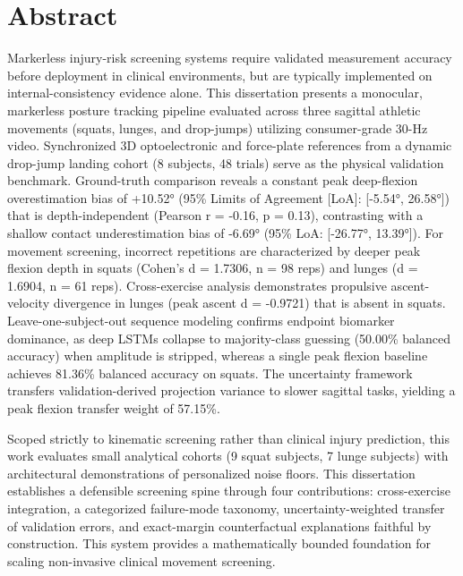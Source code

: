 \chapter*{Abstract}
\label{abstract}



Markerless injury-risk screening systems require validated measurement accuracy before deployment in clinical environments, but are typically implemented on internal-consistency evidence alone. This dissertation presents a monocular, markerless posture tracking pipeline evaluated across three sagittal athletic movements (squats, lunges, and drop-jumps) utilizing consumer-grade 30-Hz video. Synchronized 3D optoelectronic and force-plate references from a dynamic drop-jump landing cohort (8 subjects, 48 trials) serve as the physical validation benchmark. Ground-truth comparison reveals a constant peak deep-flexion overestimation bias of +10.52° (95\% Limits of Agreement [LoA]: [-5.54°, 26.58°]) that is depth-independent (Pearson r = -0.16, p = 0.13), contrasting with a shallow contact underestimation bias of -6.69° (95\% LoA: [-26.77°, 13.39°]). For movement screening, incorrect repetitions are characterized by deeper peak flexion depth in squats (Cohen's d = 1.7306, n = 98 reps) and lunges (d = 1.6904, n = 61 reps). Cross-exercise analysis demonstrates propulsive ascent-velocity divergence in lunges (peak ascent d = -0.9721) that is absent in squats. Leave-one-subject-out sequence modeling confirms endpoint biomarker dominance, as deep LSTMs collapse to majority-class guessing (50.00\% balanced accuracy) when amplitude is stripped, whereas a single peak flexion baseline achieves 81.36\% balanced accuracy on squats. The uncertainty framework transfers validation-derived projection variance to slower sagittal tasks, yielding a peak flexion transfer weight of 57.15\%.

Scoped strictly to kinematic screening rather than clinical injury prediction, this work evaluates small analytical cohorts (9 squat subjects, 7 lunge subjects) with architectural demonstrations of personalized noise floors. This dissertation establishes a defensible screening spine through four contributions: cross-exercise integration, a categorized failure-mode taxonomy, uncertainty-weighted transfer of validation errors, and exact-margin counterfactual explanations faithful by construction. This system provides a mathematically bounded foundation for scaling non-invasive clinical movement screening.
\clearpage